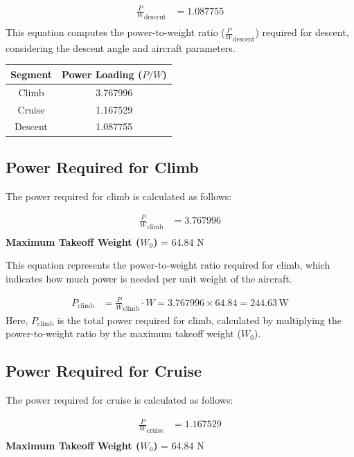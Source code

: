 \documentclass[12 pt]{article}
\begin{document}
\begin{align*}
\frac{P}{W}_{\text{descent}} &= 1.087755 \tag{3.23} \\
\end{align*}
This equation computes the power-to-weight ratio ($\frac{P}{W}_{\text{descent}}$) required for descent, considering the descent angle and aircraft parameters.

\begin{center}
\begin{tabular}{|c|c|}
\hline
Segment & Power Loading ($P/W$) \\
\hline
Climb & 3.767996 \\
Cruise & 1.167529 \\
Descent & 1.087755 \\
\hline
\end{tabular}
\end{center}

\subsection{{Power Required for Climb}}

The power required for climb is calculated as follows:

\begin{align*}
\frac{P}{W}_{\text{climb}} &= 3.767996 \tag{3.24} \\
\end{align*}
\textbf{Maximum Takeoff Weight ($W_0$)} = 64.84 N

This equation represents the power-to-weight ratio required for climb, which indicates how much power is needed per unit weight of the aircraft.

\begin{align*}
P_{\text{climb}} &= \frac{P}{W}_{\text{climb}} \cdot W = 3.767996 \times 64.84 = 244.63 \, \text{W} \tag{3.25}
\end{align*}
Here, $P_{\text{climb}}$ is the total power required for climb, calculated by multiplying the power-to-weight ratio by the maximum takeoff weight ($W_0$).

\subsection{{Power Required for Cruise}}

The power required for cruise is calculated as follows:

\begin{align*}
\frac{P}{W}_{\text{cruise}} &= 1.167529 \tag{3.26} \\
\end{align*}
\textbf{Maximum Takeoff Weight ($W_0$)} = 64.84 N
\end{document}
